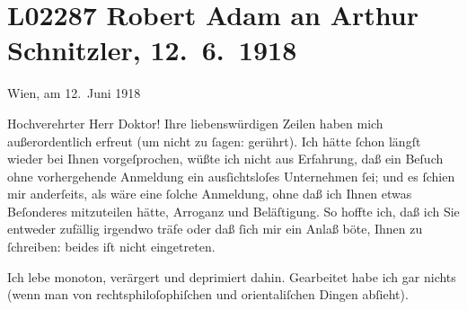 

\section[Robert Adam an Arthur Schnitzler, 12. 6. 1918]{L02287 Robert Adam an Arthur Schnitzler, 12. 6. 1918}
\nopagebreak{}
\rehead{ }\normalsize\beginnumbering{}
\toendnotes[C]{\smallbreak\pagebreak[2]}
\toendnotes[C]{\smallbreak}
\toendnotes[C]{\smallbreak}
\pstart
           \raggedleft{}{\pb}Wien, am 12. Juni 1918\pend
           
\pstart\center{}Hochverehrter Herr Doktor!\pend\vspace{0.5em}
\pstart
           Ihre liebenswürdigen Zeilen haben mich außerordentlich erfreut (um nicht zu{ }ſagen:
               gerührt). Ich hätte{ }ſchon längſt wieder bei Ihnen vorgeſprochen, wüßte ich nicht aus
               Erfahrung, daß ein Beſuch ohne vorhergehende Anmeldung ein ausſichtsloſes Unternehmen{ }ſei; und es{ }ſchien mir anderſeits, als wäre eine{ }ſolche Anmeldung, ohne daß ich Ihnen
               etwas Beſonderes mitzuteilen hätte, Arroganz und Beläſtigung. So hoffte ich, daß ich
               Sie entweder zufällig irgendwo träfe oder daß{ }ſich mir ein Anlaß böte, Ihnen zu{ }ſchreiben: beides iſt nicht eingetreten.\pend
           
\pstart
           Ich lebe monoton, verärgert und {\pb}deprimiert dahin. Gearbeitet habe ich gar nichts (wenn man von
               rechtsphiloſophiſchen und orientaliſchen Dingen abſieht).\pend
           

